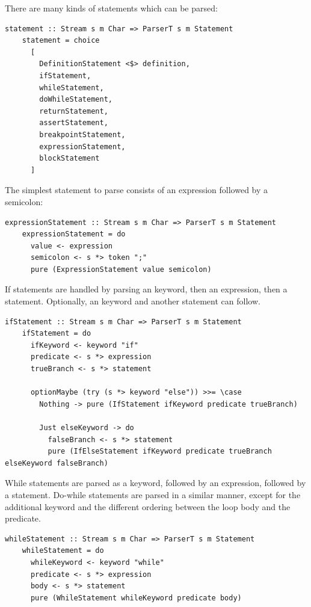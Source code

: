 \documentclass[UdineBachThesis,american,11pt]{PhdThesis}
\begin{document}
  There are many kinds of statements which can be parsed:

  \begin{lstlisting}[gobble=4,basicstyle=\ttfamily\small]
    statement :: Stream s m Char => ParserT s m Statement
    statement = choice
      [
        DefinitionStatement <$> definition,
        ifStatement,
        whileStatement,
        doWhileStatement,
        returnStatement,
        assertStatement,
        breakpointStatement,
        expressionStatement,
        blockStatement
      ]
  \end{lstlisting}

  The simplest statement to parse consists of an expression followed by a
  semicolon:

  \begin{lstlisting}[gobble=4,basicstyle=\ttfamily\small]
    expressionStatement :: Stream s m Char => ParserT s m Statement
    expressionStatement = do
      value <- expression
      semicolon <- s *> token ";"
      pure (ExpressionStatement value semicolon)
  \end{lstlisting}

  If statements are handled by parsing an \lstinline@if@ keyword, then an
  expression, then a statement. Optionally, an \lstinline@else@ keyword and
  another statement can follow.

  \begin{lstlisting}[gobble=4,basicstyle=\ttfamily\small]
    ifStatement :: Stream s m Char => ParserT s m Statement
    ifStatement = do
      ifKeyword <- keyword "if"
      predicate <- s *> expression
      trueBranch <- s *> statement

      optionMaybe (try (s *> keyword "else")) >>= \case
        Nothing -> pure (IfStatement ifKeyword predicate trueBranch)

        Just elseKeyword -> do
          falseBranch <- s *> statement
          pure (IfElseStatement ifKeyword predicate trueBranch elseKeyword falseBranch)
  \end{lstlisting}

  While statements are parsed as a \lstinline@while@ keyword, followed by an
  expression, followed by a statement. Do-while statements are parsed in a
  similar manner, except for the additional \lstinline@do@ keyword and the
  different ordering between the loop body and the predicate.

  \begin{lstlisting}[gobble=4,basicstyle=\ttfamily\small]
    whileStatement :: Stream s m Char => ParserT s m Statement
    whileStatement = do
      whileKeyword <- keyword "while"
      predicate <- s *> expression
      body <- s *> statement
      pure (WhileStatement whileKeyword predicate body)
  \end{lstlisting}
\end{document}
